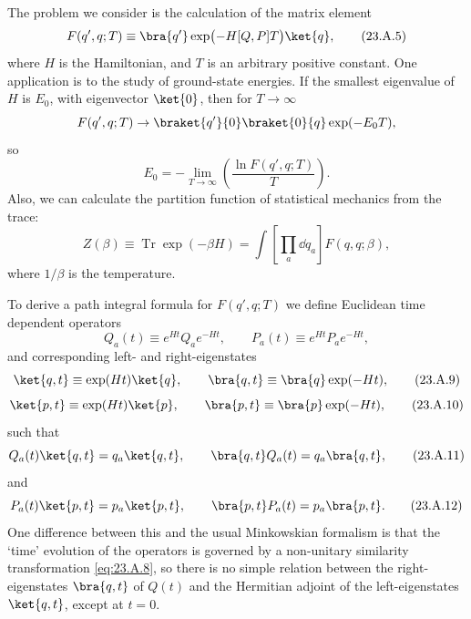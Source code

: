 The problem we consider is the calculation of the matrix element
\begin{equation}
 F(q',q;T)\equiv\bra{q'}\exp\bigl(-H[Q,P]T\bigr)\ket{q},
 \tag{23.A.5}\label{eq:23.A.5}
\end{equation}
where $H$ is the Hamiltonian, and $T$ is an arbitrary positive constant. One application is to the study of ground-state energies. If the smallest eigenvalue of $H$ is $E_0$, with eigenvector $\ket{0}$, then for $T\to\infty$
\[
 F(q',q;T)\to\braket{q'}{0}\braket{0}{q}\exp(-E_0T),
\]
so
\begin{equation}
 E_0=-\lim_{T\to\infty}\left(\frac{\ln F(q',q;T)}{T}\right).
 \tag{23.A.6}\label{eq:23.A.6}
\end{equation}
Also, we can calculate the partition function of statistical mechanics from the trace:
\begin{equation}
 Z(\beta)\equiv\operatorname{Tr}\exp(-\beta H)
 =\int\left[\prod_a \dd q_a\right]F(q,q;\beta),
 \tag{23.A.7}\label{eq:23.A.7}
\end{equation}
where $1/\beta$ is the temperature.

To derive a path integral formula for $F(q',q;T)$ we define Euclidean time dependent operators
\begin{equation}
 Q_a(t)\equiv e^{Ht}Q_ae^{-Ht},
 \qquad
 P_a(t)\equiv e^{Ht}P_ae^{-Ht},
 \tag{23.A.8}\label{eq:23.A.8}
\end{equation}
and corresponding left- and right-eigenstates
\begin{equation}
 \ket{q,t}\equiv\exp(Ht)\ket{q},
 \qquad
 \bra{q,t}\equiv\bra{q}\exp(-Ht),
 \tag{23.A.9}\label{eq:23.A.9}
\end{equation}
\begin{equation}
 \ket{p,t}\equiv\exp(Ht)\ket{p},
 \qquad
 \bra{p,t}\equiv\bra{p}\exp(-Ht),
 \tag{23.A.10}\label{eq:23.A.10}
\end{equation}
such that
\begin{equation}
 Q_a(t)\ket{q,t}=q_a\ket{q,t},
 \qquad
 \bra{q,t}Q_a(t)=q_a\bra{q,t},
 \tag{23.A.11}\label{eq:23.A.11}
\end{equation}
and
\begin{equation}
 P_a(t)\ket{p,t}=p_a\ket{p,t},
 \qquad
 \bra{p,t}P_a(t)=p_a\bra{p,t}.
 \tag{23.A.12}\label{eq:23.A.12}
\end{equation}
One difference between this and the usual Minkowskian formalism is that the `time' evolution of the operators is governed by a non-unitary similarity transformation \eqref{eq:23.A.8}, so there is no simple relation between the right-eigenstates $\bra{q,t}$ of $Q(t)$ and the Hermitian adjoint of the left-eigenstates $\ket{q,t}$, except at $t=0$.

